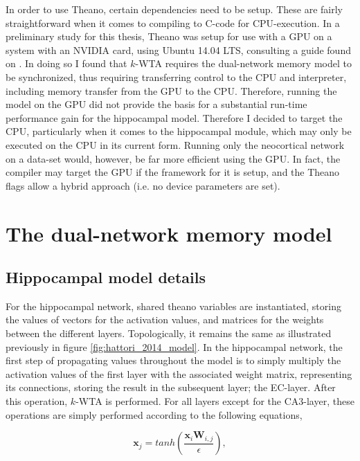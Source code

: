 In order to use Theano, certain dependencies need to be setup. These are fairly straightforward when it comes to compiling to C-code for CPU-execution. In a preliminary study for this thesis, Theano was setup for use with a GPU on a system with an NVIDIA card, using Ubuntu 14.04 LTS, consulting a guide found on \citep{LISA-lab2015b}. In doing so I found that $k$-WTA requires the dual-network memory model to be synchronized, thus requiring transferring control to the CPU and interpreter, including memory transfer from the GPU to the CPU. Therefore, running the model on the GPU did not provide the basis for a substantial run-time performance gain for the hippocampal model. Therefore I decided to target the CPU, particularly when it comes to the hippocampal module, which may only be executed on the CPU in its current form. Running only the neocortical network on a data-set would, however, be far more efficient using the GPU. In fact, the compiler may target the GPU if the framework for it is setup, and the Theano flags allow a hybrid approach (i.e. no device parameters are set).


\section{The dual-network memory model}

\subsection{Hippocampal model details}

For the hippocampal network, shared theano variables are instantiated, storing the values of vectors for the activation values, and matrices for the weights between the different layers. Topologically, it remains the same as illustrated previously in figure \ref{fig:hattori_2014_model}. In the hippocampal network, the first step of propagating values throughout the model is to simply multiply the activation values of the first layer with the associated weight matrix, representing its connections, storing the result in the subsequent layer; the EC-layer. After this operation, $k$-WTA is performed. For all layers except for the CA3-layer, these operations are simply performed according to the following equations,

\begin{equation}\label{eq:transfer_function_hpc}
    \textbf{x}_j = tanh (\frac{\textbf{x}_i \textbf{W}_{i,j}}{\epsilon}),
\end{equation}

